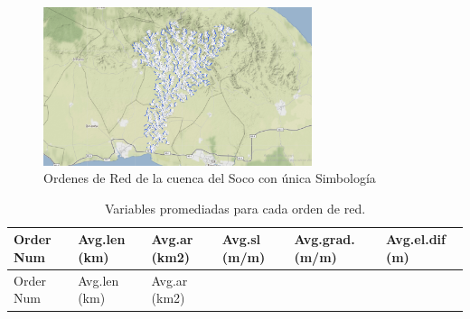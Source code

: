 \documentclass[11pt,]{article}
\begin{document}
\begin{figure}
\centering
\includegraphics[width=0.70000\textwidth]{unica sim.png}
\caption{Ordenes de Red de la cuenca del Soco con única
Simbología\label{mapasiete}}
\end{figure}

\begin{longtable}[]{@{}llllll@{}}
\caption{\label{tablacuatro}Variables promediadas para cada orden de
red.}\tabularnewline
\toprule
\begin{minipage}[b]{0.12\columnwidth}\raggedright\strut
Order Num\strut
\end{minipage} & \begin{minipage}[b]{0.13\columnwidth}\raggedright\strut
Avg.len (km)\strut
\end{minipage} & \begin{minipage}[b]{0.13\columnwidth}\raggedright\strut
Avg.ar (km2)\strut
\end{minipage} & \begin{minipage}[b]{0.13\columnwidth}\raggedright\strut
Avg.sl (m/m)\strut
\end{minipage} & \begin{minipage}[b]{0.16\columnwidth}\raggedright\strut
Avg.grad. (m/m)\strut
\end{minipage} & \begin{minipage}[b]{0.15\columnwidth}\raggedright\strut
Avg.el.dif (m)\strut
\end{minipage}\tabularnewline
\midrule
\endfirsthead
\toprule
\begin{minipage}[b]{0.12\columnwidth}\raggedright\strut
Order Num\strut
\end{minipage} & \begin{minipage}[b]{0.13\columnwidth}\raggedright\strut
Avg.len (km)\strut
\end{minipage} & \begin{minipage}[b]{0.13\columnwidth}\raggedright\strut
Avg.ar (km2)\strut
\end{minipage} & \begin{minipage}[b]{0.13\columnwidth}\raggedright\strut

\end{minipage}
\end{longtable}
\end{document}
